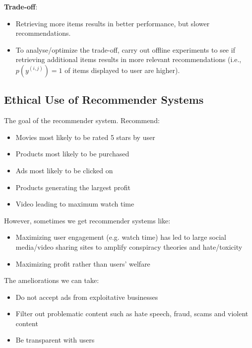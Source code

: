 \documentclass{article}
\begin{document}
\textbf{Trade-off}:

\begin{itemize}
    \item Retrieving more items results in better performance, but slower recommendations.
    \item To analyse/optimize the trade-off, carry out offline experiments to see if retrieving additional items results in more relevant recommendations (i.e., \(p(y^{(i, j)}) = 1\) of items displayed to user are higher).
\end{itemize}

\subsection{Ethical Use of Recommender Systems}

The goal of the recommender system. Recommend:

\begin{itemize}
    \item Movies most likely to be rated 5 stars by user
    \item Products most likely to be purchased
    \item Ads most likely to be clicked on
    \item Products generating the largest profit
    \item Video leading to maximum watch time
\end{itemize}

However, sometimes we get recommender systems like:

\begin{itemize}
    \item Maximizing user engagement (e.g. watch time) has led to large social media/video sharing sites to amplify conspiracy theories and hate/toxicity
    \item Maximizing profit rather than users’ welfare
\end{itemize}

The ameliorations we can take:

\begin{itemize}
    \item Do not accept ads from exploitative businesses
    \item Filter out problematic content such as hate speech, fraud, scams and violent content
    \item Be transparent with users
\end{itemize}
\end{document}

